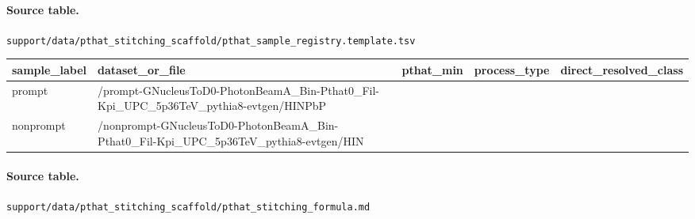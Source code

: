 \documentclass[11pt]{article}
\begin{document}
\paragraph{Source table.} \texttt{support/data/pthat\_stitching\_scaffold/pthat\_sample\_registry.template.tsv}
\begin{center}\scriptsize
\begin{tabular}{|l|l|l|l|l|}
\hline
sample\_label & dataset\_or\_file & pthat\_min & process\_type & direct\_resolved\_class \\ \hline
prompt & /prompt-GNucleusToD0-PhotonBeamA\_Bin-Pthat0\_Fil-Kpi\_UPC\_5p36TeV\_pythia8-evtgen/HINPbP &  &  &  \\ \hline
nonprompt & /nonprompt-GNucleusToD0-PhotonBeamA\_Bin-Pthat0\_Fil-Kpi\_UPC\_5p36TeV\_pythia8-evtgen/HIN &  &  &  \\ \hline
\end{tabular}
\end{center}
\paragraph{Source table.} \texttt{support/data/pthat\_stitching\_scaffold/pthat\_stitching\_formula.md}
\clearpage
\end{document}
